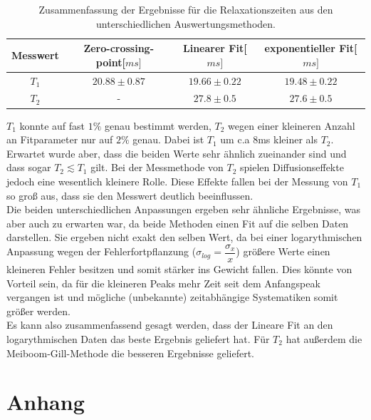 \documentclass[12pt,a4paper]{article}
\begin{document}
\begin{table}[H]
\centering
\begin{tabular}{|c|c|c|c|}
\hline
Messwert & Zero-crossing-point[$ms]$ &Linearer Fit[$ms]$ & exponentieller Fit[$ms]$\\
\hline
$T_1$ & $20.88\pm 0.87$ & $19.66\pm 0.22$ & $19.48\pm 0.22$\\
\hline
$T_2$ & - & $27.8\pm 0.5$ & $27.6\pm 0.5$\\
\hline
\end{tabular}
\caption{Zusammenfassung der Ergebnisse für die Relaxationszeiten aus den unterschiedlichen Auswertungsmethoden.}
\label{GesamtZusammenfassung}
\end{table}
$T_1$ konnte auf fast $1\%$ genau bestimmt werden, $T_2$ wegen einer kleineren Anzahl an Fitparameter nur auf $2\%$ genau. Dabei ist $T_1$ um c.a 8ms kleiner als $T_2$.\\
Erwartet wurde aber, dass die beiden Werte sehr ähnlich zueinander sind und dass sogar $T_2 \lesssim T_1$ gilt. Bei der Messmethode von $T_2$ spielen Diffusionseffekte jedoch eine wesentlich kleinere Rolle. Diese Effekte fallen bei der Messung von $T_1$ so groß aus, dass sie den Messwert deutlich beeinflussen.\\
Die beiden unterschiedlichen Anpassungen ergeben sehr ähnliche Ergebnisse, was aber auch zu erwarten war, da beide Methoden einen Fit auf die selben Daten darstellen. Sie ergeben nicht exakt den selben Wert, da bei einer logarythmischen Anpassung wegen der Fehlerfortpflanzung ($\sigma_{log} = \dfrac{\sigma_x}{x}$) größere Werte einen kleineren Fehler besitzen und somit stärker ins Gewicht fallen. Dies könnte von Vorteil sein, da für die kleineren Peaks mehr Zeit seit dem Anfangspeak vergangen ist und mögliche (unbekannte) zeitabhängige Systematiken somit größer werden.\\
Es kann also zusammenfassend gesagt werden, dass der Lineare Fit an den logarythmischen Daten das beste Ergebnis geliefert hat. Für $T_2$ hat außerdem die Meiboom-Gill-Methode die besseren Ergebnisse geliefert.

\newpage

\section{Anhang}
\end{document}

